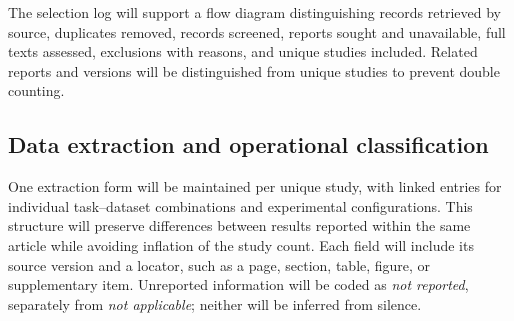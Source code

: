 \documentclass[pdflatex,bst/sn-mathphys-num]{sn-jnl}
\begin{document}
The selection log will support a flow diagram distinguishing records retrieved by source, duplicates removed, records screened, reports sought and unavailable, full texts assessed, exclusions with reasons, and unique studies included. Related reports and versions will be distinguished from unique studies to prevent double counting.


\subsection{Data extraction and operational classification}\label{sec:extraction}

One extraction form will be maintained per unique study, with linked entries for individual task--dataset combinations and experimental configurations. This structure will preserve differences between results reported within the same article while avoiding inflation of the study count. Each field will include its source version and a locator, such as a page, section, table, figure, or supplementary item. Unreported information will be coded as \emph{not reported}, separately from \emph{not applicable}; neither will be inferred from silence.
\end{document}
